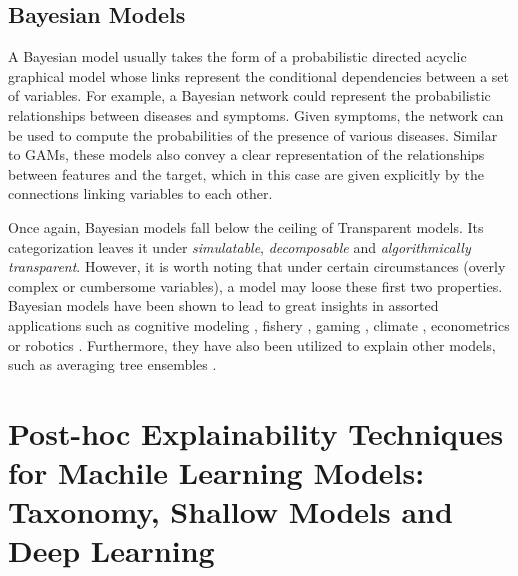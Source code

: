 \documentclass[final]{elsarticle}
\begin{document}
\subsection{Bayesian Models}

A Bayesian model usually takes the form of a probabilistic directed acyclic graphical model whose links represent the conditional dependencies between a set of variables. For example, a Bayesian network could represent the probabilistic relationships between diseases and symptoms. Given symptoms, the network can be used to compute the probabilities of the presence of various diseases. Similar to GAMs, these models also convey a clear representation of the relationships between features and the target, which in this case are  given explicitly by the connections linking variables to each other.

Once again, Bayesian models fall below the ceiling of Transparent models. Its categorization leaves it under \textit{simulatable}, \textit{decomposable} and \textit{algorithmically transparent}. However, it is worth noting that under certain circumstances (overly complex or cumbersome variables), a model may loose these first two properties. Bayesian models have been shown to lead to great insights in assorted applications such as cognitive modeling \cite{BayesianCognitive,BayesianPsychiatric}, fishery \cite{RelationshipsEnviromental,BayesianStock}, gaming \cite{BayesianRTS}, climate \cite{BayesianClimate}, econometrics \cite{BayesianEconometrics} or robotics \cite{BayesianRobot}. Furthermore, they have also been utilized to explain other models, such as averaging tree ensembles \cite{BayesianTree}.

\section{Post-hoc Explainability Techniques for Machile Learning Models: Taxonomy, Shallow Models and Deep Learning} \label{sec:posthoc}
\end{document}
